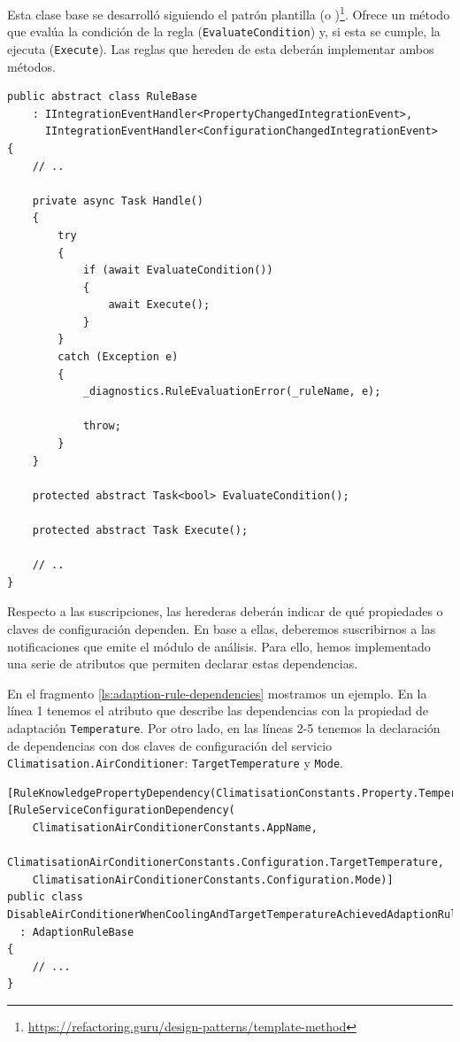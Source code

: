 Esta clase base se desarrolló siguiendo el patrón plantilla (o )\footnote{\url{https://refactoring.guru/design-patterns/template-method}}. Ofrece un método que evalúa la condición de la regla (\texttt{EvaluateCondition}) y, si esta se cumple, la ejecuta (\texttt{Execute}). Las reglas que hereden de esta deberán implementar ambos métodos.

\begin{lstlisting}[language={[Sharp]C},caption={Clase base para implementar reglas de adaptación. Se evalúa la condición, y si esta se cumple, se ejecuta.},captionpos=b, label=ls:adaption-rule-base]
public abstract class RuleBase
    : IIntegrationEventHandler<PropertyChangedIntegrationEvent>,
      IIntegrationEventHandler<ConfigurationChangedIntegrationEvent>
{
    // ..

    private async Task Handle()
    {
        try
        {
            if (await EvaluateCondition())
            {
                await Execute();
            }
        }
        catch (Exception e)
        {
            _diagnostics.RuleEvaluationError(_ruleName, e);

            throw;
        }
    }

    protected abstract Task<bool> EvaluateCondition();

    protected abstract Task Execute();

    // ..
}
\end{lstlisting}

Respecto a las suscripciones, las herederas deberán indicar de qué propiedades o claves de configuración dependen. En base a ellas, deberemos suscribirnos a las notificaciones que emite el módulo de análisis. Para ello, hemos implementado una serie de atributos que permiten declarar estas dependencias.

En el fragmento \ref{ls:adaption-rule-dependencies} mostramos un ejemplo. En la línea 1 tenemos el atributo que describe las dependencias con la propiedad de adaptación \texttt{Temperature}. Por otro lado, en las líneas 2-5 tenemos la declaración de dependencias con dos claves de configuración del servicio \texttt{Climatisation.AirConditioner}: \texttt{TargetTemperature} y \texttt{Mode}.

\begin{lstlisting}[language={[Sharp]C},caption={Las reglas declaran sus dependencias sobre propiedades de adaptación usando atributos. Estos se utilizarán para las suscripciones a los temas de los eventos.},captionpos=b, label=ls:adaption-rule-dependencies]
[RuleKnowledgePropertyDependency(ClimatisationConstants.Property.Temperature)]
[RuleServiceConfigurationDependency(
    ClimatisationAirConditionerConstants.AppName,
    ClimatisationAirConditionerConstants.Configuration.TargetTemperature,
    ClimatisationAirConditionerConstants.Configuration.Mode)]
public class DisableAirConditionerWhenCoolingAndTargetTemperatureAchievedAdaptionRule
  : AdaptionRuleBase
{
    // ...
}
\end{lstlisting}

